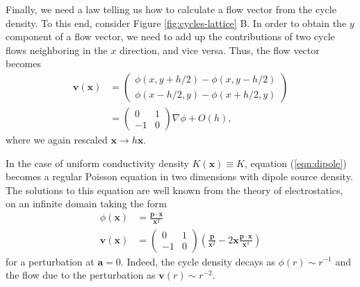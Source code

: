 \documentclass[10pt,aps,pra,twocolumn,superscriptaddress]{revtex4-1}
\renewcommand{\vec}[1]{\boldsymbol{#1}}
\begin{document}
Finally, we need a law telling us how to calculate a flow vector
from the cycle density. To this end, consider 
Figure \ref{fig:cycles-lattice} B. In order to obtain the $y$ component
of a flow vector, we need to add up the contributions of two cycle
flows neighboring in the $x$ direction, and vice versa. Thus,
the flow vector becomes
\begin{align}
    \vec v(\vec x) &= \begin{pmatrix}
        \phi(x,y+h/2) - \phi(x, y-h/2) \\
        \phi(x-h/2,y) - \phi(x+h/2,y)
    \end{pmatrix} \\
    &= \begin{pmatrix}
        0 & 1 \\
        -1 & 0
    \end{pmatrix} \nabla \phi + O(h),
\end{align}
where we again rescaled $\vec x\rightarrow h \vec x$.

In the case of uniform conductivity density $K(\vec x) \equiv K$,
equation (\ref{eqn:dipole}) becomes a regular Poisson equation
in two dimensions with dipole source density. The solutions
to this equation are well known from the theory of electrostatics, 
on an infinite domain taking the form
\begin{align}
    \phi(\vec x) &= \frac{\vec p \cdot \vec x}{\vec x^2} \\
    \vec v(\vec x) &= \begin{pmatrix} 0 & 1 \\ -1 & 0 \end{pmatrix}
        \left( \frac{\vec p}{\vec x^2} - 2 \vec x \frac{\vec p \cdot
             \vec x}{\vec x^4} \right)
\end{align}
for a perturbation at $\vec a = 0$.
Indeed, the cycle density decays as $\phi(r) \sim r^{-1}$ and 
the flow due to the perturbation as $\vec v(r) \sim r^{-2}$.




\end{document}
